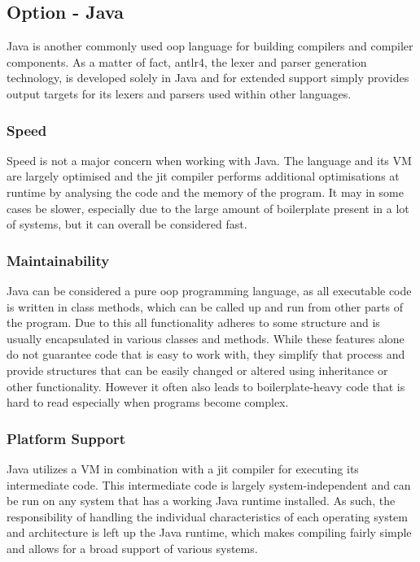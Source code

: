 \subsection{Option - Java}
\label{sec:programming-language-option-java}

Java is another commonly used \acrshort{oop} language for building compilers and compiler components. As a matter of fact, \Gls{antlr4}, the lexer and parser generation technology, is developed solely in Java and for extended support simply provides output targets for its lexers and parsers used within other languages.

\subsubsection{Speed}

Speed is not a major concern when working with Java. The language and its VM are largely optimised and the \acrshort{jit} compiler performs additional optimisations at runtime by analysing the code and the memory of the program. It may in some cases be slower, especially due to the large amount of boilerplate present in a lot of systems, but it can overall be considered fast.

\subsubsection{Maintainability}

Java can be considered a pure \acrshort{oop} programming language, as all executable code is written in class methods, which can be called up and run from other parts of the program. Due to this all functionality adheres to some structure and is usually encapsulated in various classes and methods. While these features alone do not guarantee code that is easy to work with, they simplify that process and provide structures that can be easily changed or altered using inheritance or other functionality. However it often also leads to boilerplate-heavy code that is hard to read especially when programs become complex.

\subsubsection{Platform Support}

Java utilizes a VM in combination with a \acrshort{jit} compiler for executing its intermediate code. This intermediate code is largely system-independent and can be run on any system that has a working Java runtime installed. As such, the responsibility of handling the individual characteristics of each operating system and architecture is left up the Java runtime, which makes compiling fairly simple and allows for a broad support of various systems.

